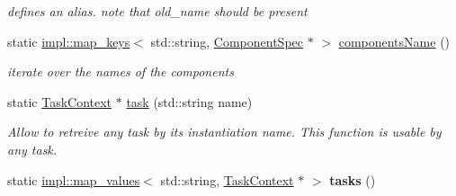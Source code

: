 \begin{DoxyCompactItemize}
\begin{DoxyCompactList}\small\item\em defines an alias. note that old\+\_\+name should be present \end{DoxyCompactList}\item 
\hypertarget{classcoco_1_1_component_registry_a814ea9d45a4b41f18bfe0a3cd73c3ef9}{}static \hyperlink{structcoco_1_1impl_1_1map__keys}{impl\+::map\+\_\+keys}$<$ std\+::string, \hyperlink{classcoco_1_1_component_spec}{Component\+Spec} $\ast$ $>$ \hyperlink{classcoco_1_1_component_registry_a814ea9d45a4b41f18bfe0a3cd73c3ef9}{components\+Name} ()\label{classcoco_1_1_component_registry_a814ea9d45a4b41f18bfe0a3cd73c3ef9}

\begin{DoxyCompactList}\small\item\em iterate over the names of the components \end{DoxyCompactList}\item 
\hypertarget{classcoco_1_1_component_registry_afe34a19892b69c05698fd9eb2fc14623}{}static \hyperlink{classcoco_1_1_task_context}{Task\+Context} $\ast$ \hyperlink{classcoco_1_1_component_registry_afe34a19892b69c05698fd9eb2fc14623}{task} (std\+::string name)\label{classcoco_1_1_component_registry_afe34a19892b69c05698fd9eb2fc14623}

\begin{DoxyCompactList}\small\item\em Allow to retreive any task by its instantiation name. This function is usable by any task. \end{DoxyCompactList}\item 
\hypertarget{classcoco_1_1_component_registry_aa012cdcf4b762dabfc86988185ed8d0e}{}static \hyperlink{structcoco_1_1impl_1_1map__values}{impl\+::map\+\_\+values}$<$ std\+::string, \hyperlink{classcoco_1_1_task_context}{Task\+Context} $\ast$ $>$ {\bfseries tasks} ()\label{classcoco_1_1_component_registry_aa012cdcf4b762dabfc86988185ed8d0e}

\end{DoxyCompactItemize}
